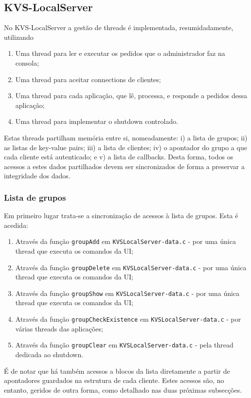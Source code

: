 \subsection{KVS-LocalServer}
No KVS-LocalServer a gestão de threads é implementada, resumidadamente, utilizando
\begin{enumerate}[noitemsep]
    \item Uma thread para ler e executar os pedidos que o administrador faz na consola;
    \item Uma thread para aceitar connections de clientes;
    \item Uma thread para cada aplicação, que lê, processa, e responde a pedidos dessa aplicação;
    \item Uma thread para implementar o shutdown controlado.
\end{enumerate}
Estas threads partilham memória entre si, nomeadamente: i) a lista de grupos; ii) as listas de key-value pairs; iii) a lista de clientes; iv) o apontador do grupo a que cada cliente está autenticado; e v) a lista de callbacks. Desta forma, todos os acessos a estes dados partilhados devem ser sincronizados de forma a preservar a integridade dos dados.

\subsubsection{Lista de grupos}
Em primeiro lugar trata-se a sincronização de acessos à lista de grupos. Esta é acedida:
\begin{enumerate}[noitemsep]
\item Através da função \texttt{groupAdd} em \texttt{KVSLocalServer-data.c} - por uma única thread que executa os comandos da UI;
\item Através da função \texttt{groupDelete} em \texttt{KVSLocalServer-data.c} - por uma única thread que executa os comandos da UI;
\item Através da função \texttt{groupShow} em \texttt{KVSLocalServer-data.c} - por uma única thread que executa os comandos da UI;
\item Através da função \texttt{groupCheckExistence} em \texttt{KVSLocalServer-data.c} - por várias threads das aplicações;
\item Através da função \texttt{groupClear} em \texttt{KVSLocalServer-data.c} - pela thread dedicada ao shutdown.
\end{enumerate}

É de notar que há também acessos a blocos da lista diretamente a partir de apontadores guardados na estrutura de cada cliente. Estes acessos são, no entanto, geridos de outra forma, como detalhado nas duas próximas subsecções.

